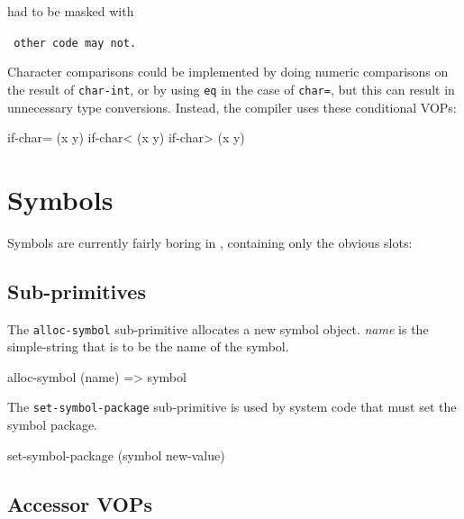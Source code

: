 had to be masked with {\tt %
other code may not.

Character comparisons could be implemented by doing numeric comparisons on the
result of {\tt char-int}, or by using {\tt eq} in the case of {\tt char=}, but this
can result in unnecessary type conversions.  Instead, the compiler uses these
conditional VOPs:
\begin{example}
if-char= (x y)
if-char< (x y)
if-char> (x y)
\end{example}

\chapter{Symbols}


Symbols are currently fairly boring in \ccl, containing only the obvious slots:


\section{Sub-primitives}

The {\tt alloc-symbol} sub-primitive allocates a new symbol object.  {\it name} is
the simple-string that is to be the name of the symbol.
\begin{example}
alloc-symbol (name) => symbol
\end{example}

The {\tt set-symbol-package} sub-primitive is used by system code that must set
the symbol package.
\begin{example}
set-symbol-package (symbol new-value)
\end{example}


\section{Accessor VOPs}

}
